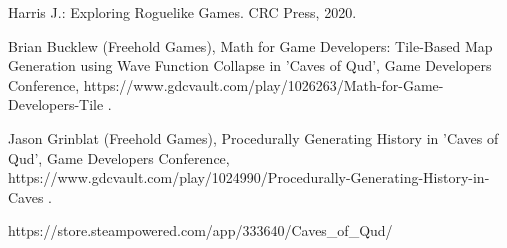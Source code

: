 \documentclass[12pt,twoside]{article}
\begin{document}
\begin{thebibliography}{4}
	

 Harris J.: Exploring Roguelike Games. CRC Press, 2020.



 Brian Bucklew (Freehold Games), Math for Game Developers: Tile-Based Map Generation using Wave Function Collapse in 'Caves of Qud', Game Developers Conference, https://www.gdcvault.com/play/1026263/Math-for-Game-Developers-Tile .

 Jason Grinblat (Freehold Games), Procedurally Generating History in 'Caves of Qud', Game Developers Conference, https://www.gdcvault.com/play/1024990/Procedurally-Generating-History-in-Caves .

 https://store.steampowered.com/app/333640/Caves\_of\_Qud/




\end{thebibliography}

\clearpage

\makesummary
\end{document}

